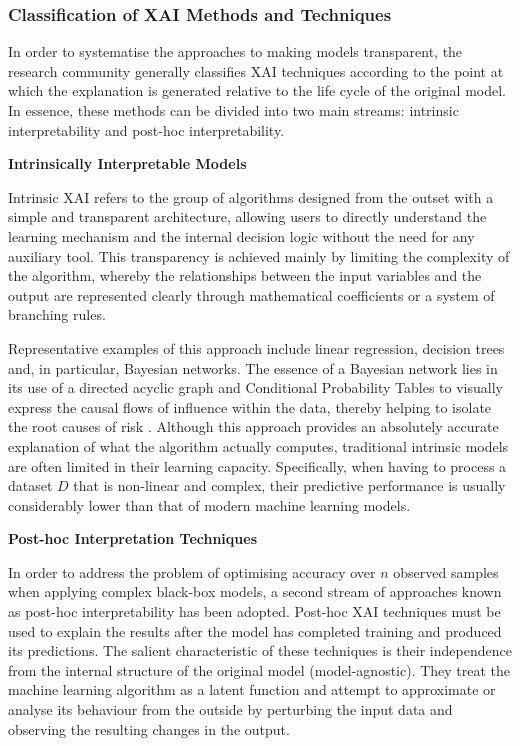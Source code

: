 \subsubsection{Classification of XAI Methods and Techniques}
\noindent
In order to systematise the approaches to making models transparent, the research community generally classifies XAI techniques according to the point at which the explanation is generated relative to the life cycle of the original model. In essence, these methods can be divided into two main streams: intrinsic interpretability and post-hoc interpretability.


\vspace{1em}
\noindent
\textbf{Intrinsically Interpretable Models}

Intrinsic XAI refers to the group of algorithms designed from the outset with a simple and transparent architecture, allowing users to directly understand the learning mechanism and the internal decision logic without the need for any auxiliary tool. This transparency is achieved mainly by limiting the complexity of the algorithm, whereby the relationships between the input variables and the output are represented clearly through mathematical coefficients or a system of branching rules.

Representative examples of this approach include linear regression, decision trees and, in particular, Bayesian networks. The essence of a Bayesian network lies in its use of a directed acyclic graph and Conditional Probability Tables to visually express the causal flows of influence within the data, thereby helping to isolate the root causes of risk \cite{liu2024credit}. Although this approach provides an absolutely accurate explanation of what the algorithm actually computes, traditional intrinsic models are often limited in their learning capacity. Specifically, when having to process a dataset $D$ that is non-linear and complex, their predictive performance is usually considerably lower than that of modern machine learning models.

\vspace{1em}
\noindent
\textbf{Post-hoc Interpretation Techniques}

In order to address the problem of optimising accuracy over $n$ observed samples when applying complex black-box models, a second stream of approaches known as post-hoc interpretability has been adopted. Post-hoc XAI techniques must be used to explain the results after the model has completed training and produced its predictions. The salient characteristic of these techniques is their independence from the internal structure of the original model (model-agnostic). They treat the machine learning algorithm as a latent function and attempt to approximate or analyse its behaviour from the outside by perturbing the input data and observing the resulting changes in the output.

